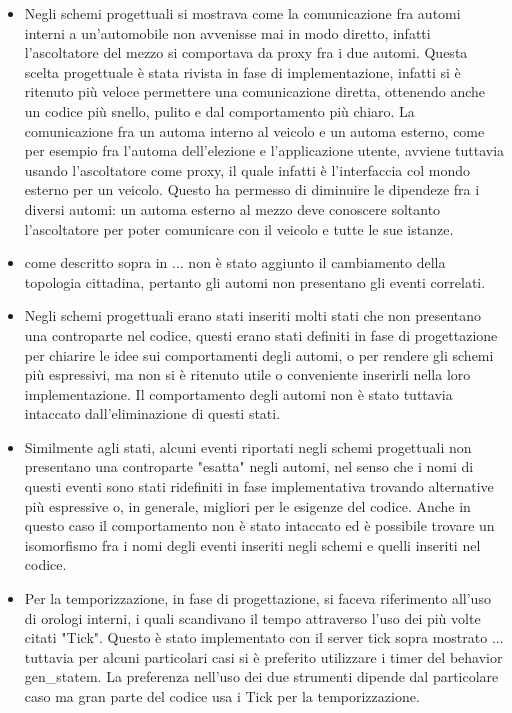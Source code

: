 \begin{itemize}
	\item Negli schemi progettuali si mostrava come la comunicazione fra automi interni a un'automobile non avvenisse mai in modo diretto, infatti l'ascoltatore del mezzo si comportava da proxy fra i due automi. Questa scelta progettuale è stata rivista in fase di implementazione, infatti si è ritenuto più veloce permettere una comunicazione diretta, ottenendo anche un codice più snello, pulito e dal comportamento più chiaro. 
	La comunicazione fra un automa interno al veicolo e un automa esterno, come per esempio fra l'automa dell'elezione e l'applicazione utente, avviene tuttavia usando l'ascoltatore come proxy, il quale infatti è l'interfaccia col mondo esterno per un veicolo. Questo ha permesso di diminuire le dipendeze fra i diversi automi: un automa esterno al mezzo deve conoscere soltanto l'ascoltatore per poter comunicare con il veicolo e tutte le sue istanze.
	\item come descritto sopra in ... non è stato aggiunto il cambiamento della topologia cittadina, pertanto gli automi non presentano gli eventi correlati.
	\item Negli schemi progettuali erano stati inseriti molti stati che non presentano una controparte nel codice, questi erano stati definiti in fase di progettazione per chiarire le idee sui comportamenti degli automi, o per rendere gli schemi più espressivi, ma non si è ritenuto utile o conveniente inserirli nella loro implementazione. Il comportamento degli automi non è stato tuttavia intaccato dall'eliminazione di questi stati. 
	\item Similmente agli stati, alcuni eventi riportati negli schemi progettuali non presentano una controparte "esatta" negli automi, nel senso che i nomi di questi eventi sono stati ridefiniti in fase implementativa trovando alternative più espressive o, in generale, migliori per le esigenze del codice. Anche in questo caso il comportamento non è stato intaccato ed è possibile trovare un isomorfismo fra i nomi degli eventi inseriti negli schemi e quelli inseriti nel codice.
	\item Per la temporizzazione, in fase di progettazione, si faceva riferimento all'uso di orologi interni, i quali scandivano il tempo attraverso l'uso dei più volte citati "Tick". Questo è stato implementato con il server tick sopra mostrato ... tuttavia per alcuni particolari casi si è preferito utilizzare i timer del behavior gen\_statem. La preferenza nell'uso dei due strumenti dipende dal particolare caso ma gran parte del codice usa i Tick per la temporizzazione.
\end{itemize}

